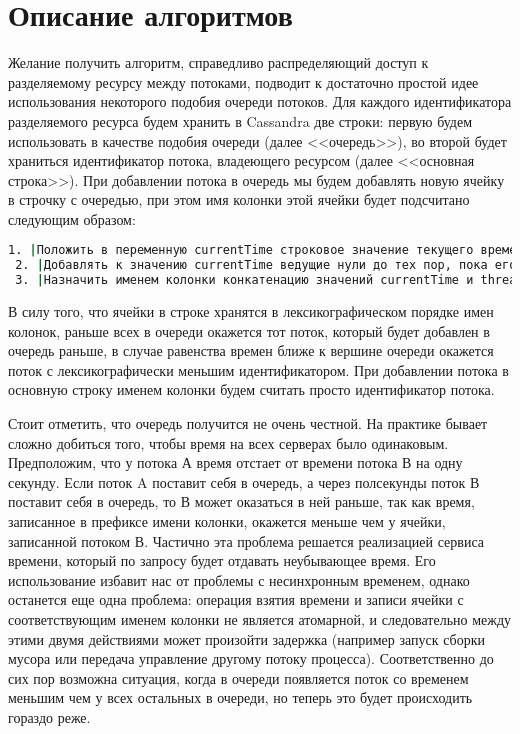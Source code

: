 \section{Описание алгоритмов}

Желание получить алгоритм, справедливо распределяющий доступ к разделяемому ресурсу между потоками, подводит к достаточно простой идее использования некоторого подобия очереди потоков.
Для каждого идентификатора разделяемого ресурса будем хранить в Cassandra две строки: первую будем использовать в качестве подобия очереди (далее <<очередь>>), во второй будет храниться идентификатор потока, владеющего ресурсом (далее <<основная строка>>).
При добавлении потока в очередь мы будем добавлять новую ячейку в строчку с очередью, при этом имя колонки этой ячейки будет подсчитано следующим образом:

\begin{lstlisting}[language=csh,caption={Определение имени колонки для ячейки в очереди}]
 1. |Положить в переменную currentTime строковое значение текущего времени в микросекундах|
 2. |Добавлять к значению currentTime ведущие нули до тех пор, пока его длина не станет равной 20|
 3. |Назначить именем колонки конкатенацию значений currentTime и threadId|
\end{lstlisting}

В силу того, что ячейки в строке хранятся в лексикографическом порядке имен колонок, раньше всех в очереди окажется тот поток, который будет добавлен в очередь раньше, в случае равенства времен ближе к вершине очереди окажется поток с лексикографически меньшим идентификатором.
При добавлении потока в основную строку именем колонки будем считать просто идентификатор потока.

Стоит отметить, что очередь получится не очень честной. На практике бывает сложно добиться того, чтобы время на всех серверах было одинаковым. Предположим, что у потока А время отстает от времени потока В на одну секунду. Если поток A поставит себя в очередь, а через полсекунды поток В поставит себя в очередь, то В может оказаться в ней раньше, так как время, записанное в префиксе имени колонки, окажется меньше чем у ячейки, записанной потоком В. Частично эта проблема решается реализацией сервиса времени, который по запросу будет отдавать неубывающее время. Его использование избавит нас от проблемы с несинхронным временем, однако останется еще одна проблема: операция взятия времени и записи ячейки с соответствующим именем колонки не является атомарной, и следовательно между этими двумя действиями может произойти задержка (например запуск сборки мусора или передача управление другому потоку процесса). Соответственно до сих пор возможна ситуация, когда в очереди появляется поток со временем меньшим чем у всех остальных в очереди, но теперь это будет происходить гораздо реже.









